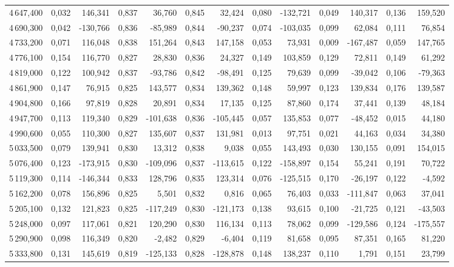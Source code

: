 \begin{longtable}{rrrrrrrrrrrrr}
4\,647,400 & 0,032 & 146,341 & 0,837 & 36,760 & 0,845 & 32,424 & 0,080 & -132,721 & 0,049 & 140,317 & 0,136 & 159,520\\
4\,690,300 & 0,042 & -130,766 & 0,836 & -85,989 & 0,844 & -90,237 & 0,074 & -103,035 & 0,099 & 62,084 & 0,111 & 76,854\\
4\,733,200 & 0,071 & 116,048 & 0,838 & 151,264 & 0,843 & 147,158 & 0,053 & 73,931 & 0,009 & -167,487 & 0,059 & 147,765\\
4\,776,100 & 0,154 & 116,770 & 0,827 & 28,830 & 0,836 & 24,327 & 0,149 & 103,859 & 0,129 & 72,811 & 0,149 & 61,292\\
4\,819,000 & 0,122 & 100,942 & 0,837 & -93,786 & 0,842 & -98,491 & 0,125 & 79,639 & 0,099 & -39,042 & 0,106 & -79,363\\
4\,861,900 & 0,147 & 76,915 & 0,825 & 143,577 & 0,834 & 139,362 & 0,148 & 59,997 & 0,123 & 139,834 & 0,176 & 139,587\\
4\,904,800 & 0,166 & 97,819 & 0,828 & 20,891 & 0,834 & 17,135 & 0,125 & 87,860 & 0,174 & 37,441 & 0,139 & 48,184\\
4\,947,700 & 0,113 & 119,340 & 0,829 & -101,638 & 0,836 & -105,445 & 0,057 & 135,853 & 0,077 & -48,452 & 0,015 & 44,180\\
4\,990,600 & 0,055 & 110,300 & 0,827 & 135,607 & 0,837 & 131,981 & 0,013 & 97,751 & 0,021 & 44,163 & 0,034 & 34,380\\
5\,033,500 & 0,079 & 139,941 & 0,830 & 13,312 & 0,838 & 9,038 & 0,055 & 143,493 & 0,030 & 130,155 & 0,091 & 154,015\\
5\,076,400 & 0,123 & -173,915 & 0,830 & -109,096 & 0,837 & -113,615 & 0,122 & -158,897 & 0,154 & 55,241 & 0,191 & 70,722\\
5\,119,300 & 0,114 & -146,344 & 0,833 & 128,796 & 0,835 & 123,314 & 0,076 & -125,515 & 0,170 & -26,197 & 0,122 & -4,592\\
5\,162,200 & 0,078 & 156,896 & 0,825 & 5,501 & 0,832 & 0,816 & 0,065 & 76,403 & 0,033 & -111,847 & 0,063 & 37,041\\
5\,205,100 & 0,132 & 121,823 & 0,825 & -117,249 & 0,830 & -121,173 & 0,138 & 93,615 & 0,100 & -21,725 & 0,121 & -43,503\\
5\,248,000 & 0,097 & 117,061 & 0,821 & 120,290 & 0,830 & 116,134 & 0,113 & 78,062 & 0,099 & -129,586 & 0,124 & -175,557\\
5\,290,900 & 0,098 & 116,349 & 0,820 & -2,482 & 0,829 & -6,404 & 0,119 & 81,658 & 0,095 & 87,351 & 0,165 & 81,220\\
5\,333,800 & 0,131 & 145,619 & 0,819 & -125,133 & 0,828 & -128,878 & 0,148 & 138,237 & 0,110 & 1,791 & 0,151 & 23,799\\

\end{longtable}

